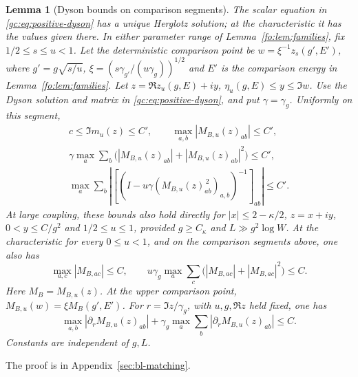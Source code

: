 \documentclass[11pt]{article}
\numberwithin{equation}{section}
\newtheorem{lemma}[theorem]{Lemma}
\theoremstyle{remark}
\begin{document}
\begin{lemma}[Dyson bounds on comparison segments]\label{da:lem:positive-height}
The scalar equation in \eqref{gc:eq:positive-dyson} has a unique
Herglotz solution; at the characteristic it has the values given there.
In either parameter range of Lemma~\ref{fo:lem:families}, fix
$1/2\le s\le u<1$. Let the deterministic comparison point be
$w=\xi^{-1}z_s(g',E')$, where $g'=g\sqrt{s/u}$,
$\xi=(s\gamma_{g'}/(u\gamma_g))^{1/2}$ and $E'$ is the comparison
energy in Lemma~\ref{fo:lem:families}. Let
$z=\Re z_u(g,E)+iy$, $\eta_u(g,E)\le y\le\Im w$.
Use the Dyson solution and matrix in \eqref{gc:eq:positive-dyson},
and put $\gamma=\gamma_g$.
Uniformly on this segment,
\begin{equation}\label{gc:eq:positive-stability}
 \begin{gathered}
 c\le\Im m_u(z)\le C',\qquad
 \max_{a,b}|M_{B,u}(z)_{ab}|\le C',\\
 \gamma\max_a\sum_b
       \bigl(|M_{B,u}(z)_{ab}|+|M_{B,u}(z)_{ab}|^2\bigr)\le C',\\
 \max_a\sum_b
 \left|\left[(I-u\gamma(M_{B,u}(z)_{ab}^{\,2})_{a,b})^{-1}
       \right]_{ab}\right|\le C'.
 \end{gathered}
\end{equation}
At large coupling, these bounds also hold directly for
$|x|\le2-\kappa/2$, $z=x+iy$, $0<y\le C/g^2$ and $1/2\le u\le1$,
provided $g\ge C_\kappa$ and $L\gg g^2\log W$.
At the characteristic for every $0\le u<1$, and on
the comparison segments above, one also has
\begin{equation}\label{gc:eq:residual-row-bounds}
 \max_{a,c}|M_{B,ac}|\le C,\qquad
 u\gamma_g\max_a\sum_c\bigl(|M_{B,ac}|+|M_{B,ac}|^2\bigr)\le C.
\end{equation}
Here $M_B=M_{B,u}(z)$. At the upper comparison point,
$M_{B,u}(w)=\xi M_B(g',E')$. For $r=\Im z/\gamma_g$, with
$u,g,\Re z$ held fixed, one has
\begin{equation}\label{da:eq:height-derivative}
 \max_{a,b}|\partial_rM_{B,u}(z)_{ab}|
 +\gamma_g\max_a\sum_b|\partial_rM_{B,u}(z)_{ab}|\le C.
\end{equation}
Constants are independent of $g,L$.
\end{lemma}
The proof is in Appendix~\ref{sec:bl-matching}.
\end{document}
